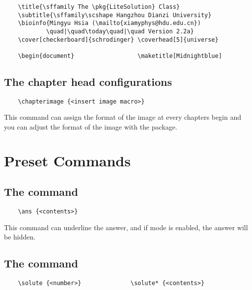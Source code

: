 \documentclass[mtpro2]{litesolution}
\begin{document}
\begin{verbatim}
    \title{\sffamily The \pkg{LiteSolution} Class}
    \subtitle{\sffamily\scshape Hangzhou Dianzi University}
    \bioinfo{Mingyu Hsia (\mailto{xiamyphys@hdu.edu.cn})
            \quad|\quad\today\quad|\quad Version 2.2a}
    \cover[checkerboard]{schrodinger} \coverhead[5]{universe}

    \begin{document}                  \maketitle[Midnightblue]
\end{verbatim}

\subsection{The chapter head configurations}

\begin{verbatim}
    \chapterimage {<insert image macro>}
\end{verbatim}

This command can assign the format of the image at every chapters begin and you can adjust the format of the image with the  package.

\section{Preset Commands}

\subsection{The  command}

\begin{verbatim}
    \ans {<contents>}
\end{verbatim}
 
This command can underline the answer, and if mode  is enabled, the answer will be hidden.

\subsection{The  command}

\begin{verbatim}
    \solute {<number>}              \solute* {<contents>}
\end{verbatim}
\end{document}
